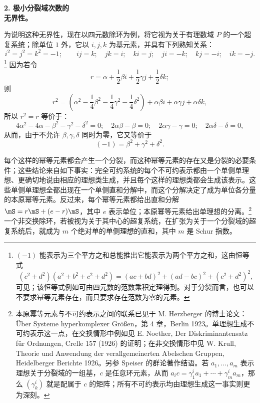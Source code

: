 
\begin{center}
\textbf{2. 极小分裂域次数的\\
无界性。}
\end{center}

为说明这种无界性，现在以四元数除环为例，将它视为关于有理数域 $P$ 的一个超复系统；除单位 $1$ 外，它以 $i,j,k$ 为基元素，并具有下列熟知关系：
\[
 i^2=j^2=k^2=-1;\qquad ij=k;\quad jk=i;\quad ki=j;\quad ji=-k;\quad kj=-i;\quad ik=-j.
\]
\footnote{$(-1)$ 能表示为三个平方之和总能推出它能表示为两个平方之和，这由恒等式
\[
(c^2+d^2)(a^2+b^2+c^2+d^2)=(ac+bd)^2+(ad-bc)^2+(c^2+d^2)^2,
\]
可见；该恒等式例如可由四元数的范数乘积定理得到。对于分裂而言，也可以不要求幂等元素存在，而只要求存在范数为零的元素。} 因为若令
\[
        r=\alpha+\frac12\beta i+\frac12\gamma j+\frac12\delta k;
\]
则
\[
        r^2=\left(\alpha^2-\frac14\beta^2-\frac14\gamma^2-\frac14\delta^2\right)
          +\alpha\beta i+\alpha\gamma j+\alpha\delta k,
\]
所以 $r^2=r$ 等价于：
\[
4\alpha^2-4\alpha-\beta^2-\gamma^2-\delta^2=0;\quad
2\alpha\beta-\beta=0;\quad 2\alpha\gamma-\gamma=0;\quad 2\alpha\delta-\delta=0,
\]
从而，由于不允许 $\beta,\gamma,\delta$ 同时为零，它又等价于
\[
        (-1)=\beta^2+\gamma^2+\delta^2.
\]

每个这样的幂等元素都会产生一个分裂，而这种幂等元素的存在又是分裂的必要条件；这些结论来自如下事实：完全可约系统的每个不可约表示都由一个单侧单理想、更确切地说由相应的理想类生成，并且每个这样的理想类都会生成该表示。这些单侧单理想全都出现在一个单侧直和分解中，而这个分解决定了成为单位各分量的\guillemotright{}本原\guillemotleft{}幂等元素。反过来，每个幂等元素都给出直和分解 $\mS=r\mS+(e-r)\mS$，其中 $e$ 表示单位；\guillemotright{}本原\guillemotleft{}幂等元素给出单理想的分离。\footnote{本原幂等元素与不可约表示之间的联系已见于 M. Herzberger 的博士论文：Über Systeme hyperkomplexer Größen，第 4 章，Berlin 1923。单理想生成不可约表示这一点，在交换情形中例如见 E. Noether, Der Diskriminantensatz für Ordnungen, Crelle 157 (1926) 的证明；在非交换情形中见 W. Krull, Theorie und Anwendung der verallgemeinerten Abelschen Gruppen, Heidelberger Berichte 1926。另参 Speiser 的群论著作结语。若 $a_1,\ldots,a_m$ 表示理想关于分裂域的一组基，$c$ 是任意环元素，从而 $a_i c=\gamma^i_1 a_1+\cdots+\gamma^i_m a_m$，那么 $(\gamma^i_k)$ 就是配属于 $c$ 的矩阵；所有不可约表示均由理想生成这一事实则更为深刻。} 一个非交换除环，若被视为关于其中心的超复系统，在扩张为关于一个分裂域的超复系统后，就成为 $m$ 个绝对单的单侧理想的直和，其中 $m$ 是 Schur 指数。

